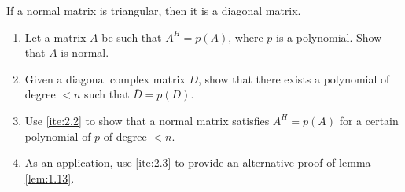 \documentclass{ctexart}
\begin{document}
\begin{lemma}\label{lem:1.13}
  If a normal matrix is triangular, then it is a diagonal matrix.
\end{lemma}
\begin{problem} 
  \begin{enumerate}
    \item \label{ite:2.1} Let a matrix \(A \) be such that \(A^H =p(A) \), where \(p \) is a polynomial. 
  Show that \(A \) is normal. 
\item \label{ite:2.2}   Given a diagonal complex matrix \(D \), show 
  that there exists a polynomial of degree \(< n \) such that \(\overline{D} =p(D ) \). 
\item \label{ite:2.3}   Use \ref{ite:2.2} to show that a normal matrix satisfies \(A^H=p(A) \) for a certain 
  polynomial of \(p \) of degree \(<n \). 
\item \label{ite:2.4}   As an application, use \ref{ite:2.3}  to 
  provide an alternative proof of lemma \ref{lem:1.13}. 
  \end{enumerate}
\end{problem}
\end{document}
